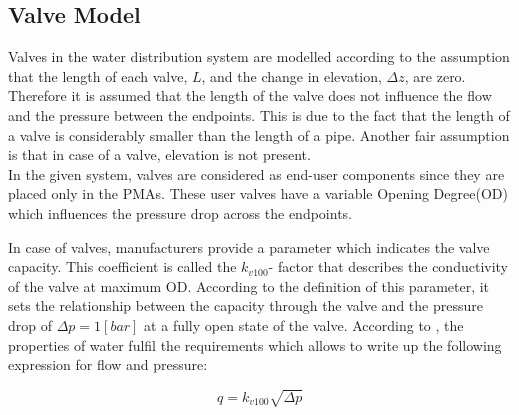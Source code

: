 \subsection{Valve Model}  
\label{ValveModel}


Valves in the water distribution system are modelled according to the assumption that the length of each valve, $L$, and the change in elevation, $\Delta z$, are zero. Therefore it is assumed that the length of the valve does not influence the flow and the pressure between the endpoints. This is due to the fact that the length of a valve is considerably smaller than the length of a pipe. Another fair assumption is that in case of a valve, elevation is not present. \\
In the given system, valves are considered as end-user components since they are placed only in the PMAs. These user valves have a variable Opening Degree(OD) which influences the pressure drop across the endpoints. 

%


In case of valves, manufacturers provide a parameter which indicates the valve capacity. This coefficient is called the $k_{v100}$- factor that describes the conductivity of the valve at maximum OD. According to the definition of this parameter, it sets the relationship between the capacity through the valve and the pressure drop of $\Delta p = 1 [bar]$ at a fully open state of the valve. According to \cite{kvvalve}, the properties of water fulfil the requirements which allows to write up the following expression for flow and pressure: 

\begin{equation}
\label{kvequation}
 q =  k_{v100} \sqrt{\Delta p} 
\end{equation}

